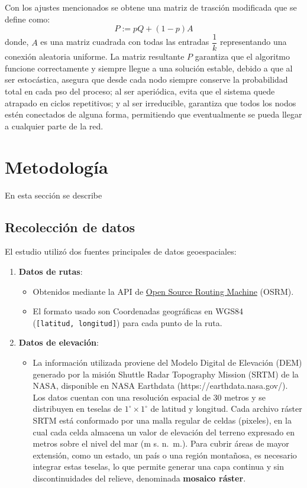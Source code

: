\documentclass[
  letterpaper,
  DIV=11,
  numbers=noendperiod]{scrreprt}
\providecommand{\tightlist}{%
  \setlength{\itemsep}{0pt}\setlength{\parskip}{0pt}}
\begin{document}
Con los ajustes mencionados se obtene una matriz de trasción modificada
que se define como: \[P:= p Q +(1-p)A\] donde, \(A\) es una matriz
cuadrada con todas las entradas \(\dfrac{1}{k}\) representando una
conexión aleatoria uniforme. La matriz resultante \(P\) garantiza que el
algoritmo funcione correctamente y siempre llegue a una solución
estable, debido a que al ser estocástica, asegura que desde cada nodo
siempre conserve la probabilidad total en cada pso del proceso; al ser
aperiódica, evita que el sistema quede atrapado en ciclos repetitivos; y
al ser irreducible, garantiza que todos los nodos estén conectados de
alguna forma, permitiendo que eventualmente se pueda llegar a cualquier
parte de la red.

\chapter{Metodología}\label{metodologuxeda}

En esta sección se describe

\section{Recolección de datos}\label{recolecciuxf3n-de-datos}

El estudio utilizó dos fuentes principales de datos geoespaciales:

\begin{enumerate}
\def\labelenumi{\arabic{enumi}.}
\tightlist
\item
  \textbf{Datos de rutas}:

  \begin{itemize}
  \tightlist
  \item
    Obtenidos mediante la API de \href{http://project-osrm.org/}{Open
    Source Routing Machine} (OSRM).
  \item
    El formato usado son Coordenadas geográficas en WGS84
    (\texttt{{[}latitud,\ longitud{]}}) para cada punto de la ruta.
  \end{itemize}
\item
  \textbf{Datos de elevación}:

  \begin{itemize}
  \tightlist
  \item
    La información utilizada proviene del Modelo Digital de Elevación
    (DEM) generado por la misión Shuttle Radar Topography Mission (SRTM)
    de la NASA, disponible en NASA Earthdata
    (https://earthdata.nasa.gov/). Los datos cuentan con una resolución
    espacial de 30 metros y se distribuyen en teselas de
    \(1^{\circ} \times 1^{\circ}\) de latitud y longitud. Cada archivo
    ráster SRTM está conformado por una malla regular de celdas
    (pixeles), en la cual cada celda almacena un valor de elevación del
    terreno expresado en metros sobre el nivel del mar (m s. n.~m.).
    Para cubrir áreas de mayor extensión, como un estado, un país o una
    región montañosa, es necesario integrar estas teselas, lo que
    permite generar una capa continua y sin discontinuidades del
    relieve, denominada \textbf{mosaico ráster}.
  \end{itemize}
\end{enumerate}
\end{document}
